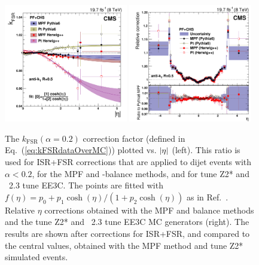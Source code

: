 \documentclass[11pt,twoside,a4paper,cmspaper,final,collab]{cms-tdr}
\begin{document}
\begin{figure}[htbp!]
\includegraphics[width=0.48\textwidth]{Figure_016-a.pdf}
\includegraphics[width=0.48\textwidth]{Figure_016-b.pdf}
\caption{\label{fig:kfsr}
The $k_\mathrm{FSR}(\alpha=0.2)$ correction factor (defined in Eq.~(\ref{eq:kFSRdataOverMC})) plotted vs. $\lvert \eta \rvert$ (left). This ratio is used for ISR+FSR corrections that are applied to dijet events with $\alpha<0.2$, for the MPF and \pt-balance methods, and for  tune Z2* and \HERWIGpp~2.3 tune EE3C. The points are fitted with $f(\eta) = p_0 + {p_1 \cosh(\eta)}/{( 1 + p_2 \cosh(\eta) )}$ as in Ref.~\cite{JEC_JINST}.  Relative $\eta$ corrections obtained with the MPF and balance methods and the  tune Z2* and \HERWIGpp~2.3 tune EE3C MC generators (right). The results are shown after corrections for ISR+FSR, and compared to the central values, obtained with the MPF method and  tune Z2* simulated events. }
\end{figure}
\end{document}
